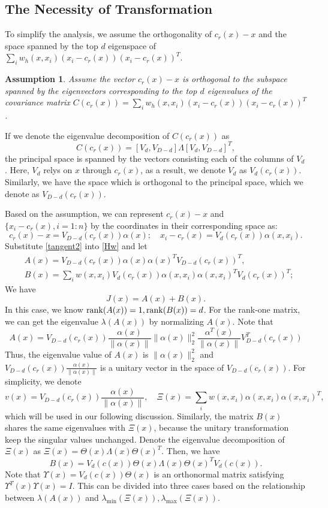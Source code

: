 \documentclass[aos,preprint]{imsart}
\newtheorem{assumption}[theorem]{Assumption}
\theoremstyle{remark}
\begin{document}
\subsection{The Necessity of Transformation}
To simplify the analysis, we assume the orthogonality of $c_r(x)-x$ and the space spanned by the top $d$ eigenspace of $\sum_i w_h(x, x_i) (x_i-c_r(x)) (x_i-c_r(x))^T$.
\begin{assumption}
Assume the vector $c_r(x)-x$ is orthogonal to the subspace spanned by the eigenvectors corresponding to the top $d$ eigenvalues of the covariance matrix $C(c_r(x)) = \sum_i w_h(x, x_i) (x_i-c_r(x)) (x_i-c_r(x))^T$. 
\end{assumption}
If we denote the eigenvalue decomposition of $C(c_r(x))$ as 
\[
C(c_r(x)) = [ V_d, V_{D-d}] \Lambda [ V_d, V_{D-d}]^T,
\]
the principal space is spanned by the vectors consisting each of the columns of $V_d$. Here, $V_d$ relys on $x$ through $c_r(x)$, as a result, we denote $V_d$ as $V_d(c_r(x))$. Similarly, we have the space which is orthogonal to the principal space, which we denote as $V_{D-d}(c_r(x))$.

Based on the assumption, we can represent $c_r(x)-x$ and $\{x_i-c_r(x), i=1:n\}$ by the coordinates in their corresponding space as:
\begin{equation} \label{tangent2}
c_r(x) - x =  V_{D-d}(c_r(x)) \alpha(x); \quad x_i-c_r(x) = V_d(c_r(x))\alpha(x, x_i).
\end{equation}
Substitute \eqref{tangent2} into \eqref{Hw} and let
\begin{align*}
&A(x)= V_{D-d}(c_r(x)) \alpha(x) \alpha(x)^T V_{D-d}(c_r(x))^T,\\
&B(x)=\sum_i w(x, x_i) V_d(c_r(x)) \alpha(x, x_i)\alpha(x, x_i)^T V_d(c_r(x))^T ;
\end{align*}
We have
\[
J(x) =A(x) + B(x).
\]
In this case, we know ${\rm rank}(A(x))=1, {\rm rank} (B(x))=d$. For the rank-one matrix, we can get the eigenvalue  $\lambda(A(x))$ by normalizing $A(x)$. Note that
\[
A(x) = V_{D-d}(c_r(x))\frac{\alpha(x)}{\|\alpha(x)\|}  \|\alpha(x)\|_2^2 \frac{\alpha^T(x)}{\|\alpha(x)\|}  V^T_{D-d}(c_r(x))
\]
Thus, the eigenvalue value of $A(x)$ is $\|\alpha(x)\|_2^2$ and $V_{D-d}(c_r(x))\frac{\alpha(x)}{\|\alpha(x)\|}$ is a unitary vector in the space of $V_{D-d}(c_r(x))$. For simplicity, we denote 
\[
v(x) = V_{D-d}(c_r(x))\frac{\alpha(x)}{\|\alpha(x)\|},\quad
\Xi (x) = \sum_i w(x, x_i) \alpha(x, x_i)\alpha(x, x_i)^T,
\]
which will be used in our following discussion.
Similarly, the matrix $B(x)$ shares the same eigenvalues  with $\Xi (x)$, because the unitary transformation keep the singular values unchanged. 
Denote the eigenvalue decomposition of $\Xi (x)$ as  $\Xi(x) = \Theta(x) \Lambda(x) \Theta(x)^T$. Then, we have
\[
B(x) = V_d(c(x))\Theta(x) \Lambda(x)\Theta(x)^T V_d(c(x)).
\]
Note that $\Upsilon(x) = V_d(c(x))\Theta(x)$ is an orthonormal matrix satisfying 
$\Upsilon^T (x)\Upsilon(x)=I$. This can be divided into three cases based on the relationship between $\lambda(A(x))$ and $\lambda_{\min}(\Xi(x)), \lambda_{\max}(\Xi(x))$.
\end{document}

